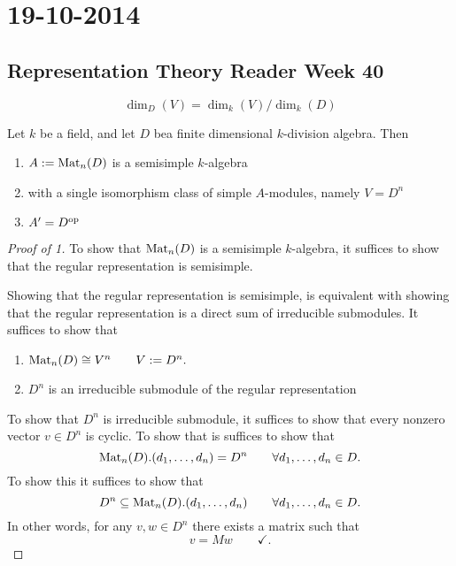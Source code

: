 \section{19-10-2014}
\subsection{Representation Theory Reader Week 40}


\begin{prop}
\[
\dim_D(V)=\dim_{k}(V)/\dim_{k}(D)
\]
\end{prop}


\begin{prop}
Let \(k\) be a field, and let \(D\) bea finite dimensional \(k\)-division algebra. Then

\begin{enumerate}
  \item \(A:=\operatorname{Mat}_{n}(D)\) is a semisimple \(k\)-algebra
  \item with a single isomorphism class of simple \(A\)-modules, namely \(V=D^n\)
  \item \(A'=D^{\operatorname{op}}\)
\end{enumerate}
\end{prop}


\begin{proof}[Proof of 1]
To show that \(\operatorname{Mat}_{n}(D)\) is a semisimple \(k\)-algebra, it suffices to show that the regular representation is semisimple.

Showing that the regular representation is semisimple, is equivalent with showing that the regular representation is a direct sum of irreducible submodules.
It suffices to show that

\begin{enumerate}
  \item \(\operatorname{Mat}_{n}(D)\cong V^n \qquad V:=D^n.\)
  \item \(D^n\) is an irreducible submodule of the regular representation
\end{enumerate}

To show that \(D^n\) is irreducible submodule, it suffices to show that every nonzero vector \(v\in D^n\) is cyclic. To show that is suffices to show that
\[
\operatorname{Mat}_{n}(D).(d_{1},\ldots ,d_{n})=D^n \qquad \forall d_{1},\ldots ,d_{n}\in D.
\]
To show this it suffices to show that
\[
D^n\subseteq \operatorname{Mat}_{n}(D).(d_{1},\ldots ,d_{n}) \qquad \forall d_{1},\ldots ,d_{n}\in D.
\]
In other words, for any \(v,w\in D^n\) there exists a matrix such that
\[
v=Mw \qquad \checkmark.
\]

\end{proof}

